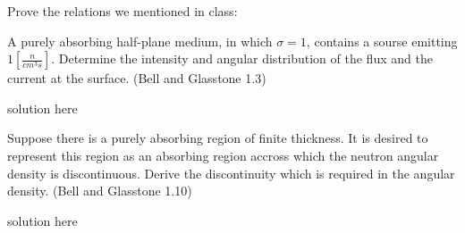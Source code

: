 \documentclass[11pt,answers,addpoints]{exam}
\begin{document}
\begin{questions}
        \question Prove the relations we mentioned in class:


        \question[40] A purely absorbing half-plane medium, in which $\sigma = 1$, 
        contains a sourse emitting $1\left[\frac{n}{cm^3s}\right]$. Determine 
                the intensity and angular distribution of the flux and the 
                current at the surface. (Bell and Glasstone 1.3)
        \begin{solution}
                solution here
        \end{solution}

        \question[45] Suppose there is a purely absorbing region of finite 
        thickness. It is desired to represent this region as an absorbing 
        region accross which the neutron angular density is discontinuous. 
        Derive the discontinuity which is required in the angular density. 
        (Bell and Glasstone 1.10)
        \begin{solution}
                solution here
        \end{solution}

\end{questions}



%
%
\end{document}
